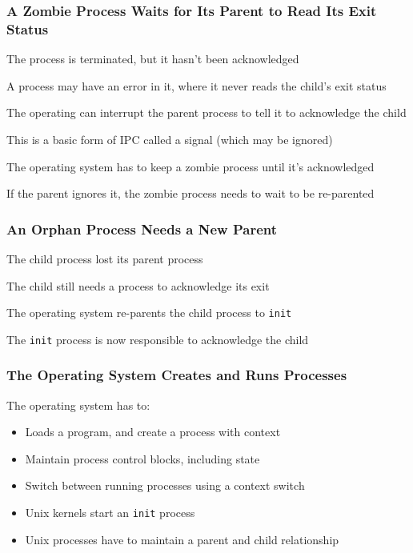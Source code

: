   \begin{frame}
    \frametitle{A Zombie Process Waits for Its Parent to Read Its Exit Status}

    The process is terminated, but it hasn't been acknowledged

    \vspace{2em}

    A process may have an error in it, where it never reads the child's exit status

    \vspace{2em}

    The operating can interrupt the parent process to tell it to acknowledge the child

    \hspace{2em} This is a basic form of IPC called a signal (which may be ignored)

    \vspace{4em}

    The operating system has to keep a zombie process until it's acknowledged

    \hspace{2em} If the parent ignores it, the zombie process needs to wait to
    be re-parented
  \end{frame}

  \begin{frame}
    \frametitle{An Orphan Process Needs a New Parent}

    The child process lost its parent process

    \hspace{2em} The child still needs a process to acknowledge its exit

    \vspace{2em}

    The operating system re-parents the child process to \texttt{init}

    \hspace{2em} The \texttt{init} process is now responsible to acknowledge the
                 child
  \end{frame}

  \begin{frame}
    \frametitle{The Operating System Creates and Runs Processes}

    The operating system has to:
    \begin{itemize}
      \item Loads a program, and create a process with context
      \item Maintain process control blocks, including state
      \item Switch between running processes using a context switch
      \item Unix kernels start an \texttt{init} process
      \item Unix processes have to maintain a parent and child relationship
    \end{itemize}
  \end{frame}

